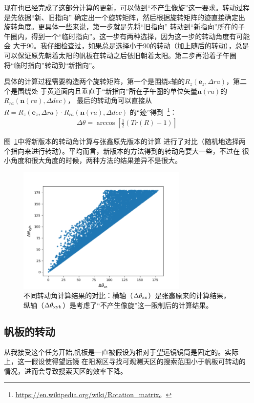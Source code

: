 \documentclass[a4paper,11pt]{ctexart}
\begin{document}
现在也已经完成了这部分计算的更新，可以做到“不产生像旋”这一要求。转动过程是先依据“新、旧指向”
确定出一个旋转矩阵，然后根据旋转矩阵的迹直接确定出旋转角度。更具体一些来说，第一步就是先将“旧指向”
转动到“新指向”所在的子午圈内，得到一个“临时指向”。这一步有两种选择，因为这一步的转动角度有可能会
大于90\textdegree。我仔细检查过，如果总是选择小于90\textdegree 的转动（加上随后的转动），总是
可以保证原先朝着太阳的帆板在转动之后依旧朝着太阳。第二步再沿着子午圈将“临时指向”转动到“新指向”。

具体的计算过程需要构造两个旋转矩阵，第一个是围绕z轴的$R_z(\bm{e}_z,\Delta ra)$，第二个是围绕处
于黄道面内且垂直于“新指向”所在子午圈的单位矢量$\bm{n}(ra)$的$R_{ra}(\bm{n}(ra),\Delta dec)$，
最后的转动角可以直接从$R=R_z(\bm{e}_z,\Delta ra)\cdot R_{ra}(\bm{n}(ra),\Delta dec)$
的“迹”得到~\footnote{\url{https://en.wikipedia.org/wiki/Rotation_matrix}。}：
\begin{eqnarray}
\Delta\theta = \arccos \left[ \frac{1}{2}(Tr(R)-1) \right]
\end{eqnarray}

图~\ref{fig:cmp_cmg_rot}中将新版本的转动角计算与张鑫原先版本的计算
进行了对比（随机地选择两个指向来进行转动）。平均而言，新版本的方法得到的转动角要大一些，不过在
很小角度和很大角度的时候，两种方法的结果差异不是很大。

\begin{figure}[h!]
\centering
\includegraphics[width=0.75\textwidth]{figures/cmp_cmg_rot}
\caption{不同转动角计算结果的对比：横轴（$\Delta\theta_{\rm zx}$）是张鑫原来的计算结果，
纵轴（$\Delta\theta_{\rm xyh}$）是考虑了“不产生像旋”这一限制后的计算结果。}
\label{fig:cmp_cmg_rot}
\end{figure}


\subsection{帆板的转动}
\label{sub:panel}
从我接受这个任务开始,帆板是一直被假设为相对于望远镜镜筒是固定的。实际上，这一假设使得望远镜
在阳照区寻找可观测天区的搜索范围小于帆板可转动的情况，进而会导致搜索天区的效率下降。
\end{document}
